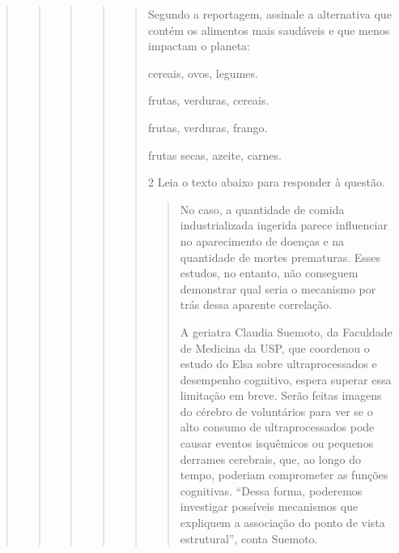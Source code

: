 \begin{quote}
\begin{quote}
\begin{quote}
\begin{quote}
\begin{quote}

Segundo a reportagem, assinale a alternativa que contém os alimentos
mais saudáveis e que menos impactam o planeta:

\begin{escolha}
  
    \item cereais, ovos, legumes.
  
    \item frutas, verduras, cereais.
  
    \item frutas, verduras, frango.
  
    \item frutas secas, azeite, carnes.

\end{escolha}


\num{2} Leia o texto abaixo para responder à questão. 

\begin{quote}

No caso, a quantidade de comida industrializada ingerida parece
influenciar no aparecimento de doenças e na quantidade de mortes
prematuras. Esses estudos, no entanto, não conseguem demonstrar qual
seria o mecanismo por trás dessa aparente correlação.

A geriatra Claudia Suemoto, da Faculdade de Medicina da USP, que
coordenou o estudo do Elsa sobre ultraprocessados e desempenho
cognitivo, espera superar essa limitação em breve. Serão feitas imagens
do cérebro de voluntários para ver se o alto consumo de ultraprocessados
pode causar eventos isquêmicos ou pequenos derrames cerebrais, que, ao
longo do tempo, poderiam comprometer as funções cognitivas. ``Dessa
forma, poderemos investigar possíveis mecanismos que expliquem a
associação do ponto de vista estrutural'', conta Suemoto.

\end{quote}


\end{quote}
\end{quote}
\end{quote}
\end{quote}
\end{quote}
